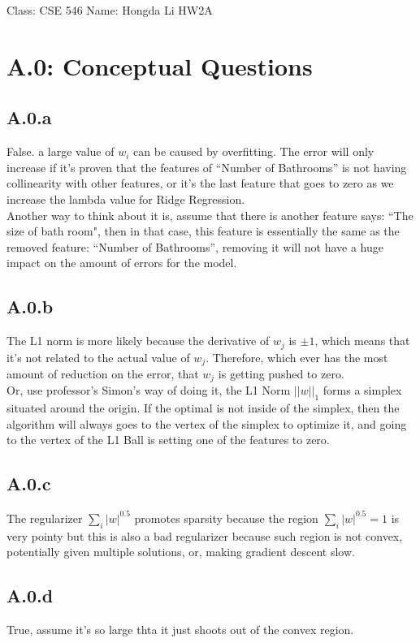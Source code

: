 \documentclass[]{article}
\begin{document}
\begin{center}
    Class: CSE 546 \quad Name: Hongda Li \quad HW2A
\end{center}

\section*{A.0: Conceptual Questions}
    \subsection*{A.0.a}    
        False. a large value of $w_i$ can be caused by overfitting. The error will only increase if it's proven that the features of ``Number of Bathrooms'' is not having collinearity with other features, or it's the last feature that goes to zero as we increase the lambda value for Ridge Regression. 
        \\
        Another way to think about it is, assume that there is another feature says: ``The size of bath room", then in that case, this feature is essentially the same as the removed feature: ``Number of Bathrooms'', removing it will not have a huge impact on the amount of errors for the model. 
    \subsection*{A.0.b}
        The L1 norm is more likely because the derivative of $w_j$ is $\pm 1$, which means that it's not related to the actual value of $w_j$. Therefore, which ever has the most amount of reduction on the error, that $w_j$ is getting pushed to zero. 
        \\
        Or, use professor's Simon's way of doing it, the L1 Norm $||w||_1$ forms a simplex situated around the origin. If the optimal is not inside of the simplex, then the algorithm will always goes to the vertex of the simplex to optimize it, and going to the  vertex of the L1 Ball is setting one of the features to zero. 
    \subsection*{A.0.c}
        The regularizer $\sum_{i}|w|^{0.5}$ promotes sparsity because the region $\sum_{i}|w|^{0.5} = 1$ is very pointy but this is also a bad regularizer because such region is not convex, potentially given multiple solutions, or, making gradient descent slow. 
    \subsection*{A.0.d}
        True, assume it's so large thta it just shoots out of the convex region. 
\end{document}
